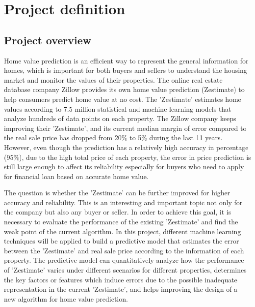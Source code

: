 \documentclass[12pt]{article}
\begin{document}
\maketitle

\section{Project definition}\label{sec:definition}
\subsection{Project overview}
Home value prediction is an efficient way to represent the general information for homes, which is important for both buyers and sellers to understand the housing market and monitor the values of their properties. The online real estate database company Zillow provides its own home value prediction (Zestimate) to help consumers predict home value at no cost. The 'Zestimate' estimates home values according to 7.5 million statistical and machine learning models that analyze hundreds of data points on each property. The Zillow company keeps improving their 'Zestimate', and its current median margin of error compared to the real sale price has dropped from 20\% to 5\% during the last 11 years. However, even though the prediction has a relatively high accuracy in percentage (95\%), due to the high total price of each property, the error in price prediction is still large enough to affect its reliability especially for buyers who need to apply for financial loan based on accurate home value.

The question is whether the 'Zestimate' can be further improved for higher accuracy and reliability. This is an interesting and important topic not only for the company but also any buyer or seller. In order to achieve this goal, it is necessary to evaluate the performance of the existing 'Zestimate' and find the weak point of the current algorithm. In this project, different machine learning techniques will be applied to build a predictive model that estimates the error between the 'Zestimate' and real sale price according to the information of each property. The predictive model can quantitatively analyze how the performance of 'Zestimate' varies under different scenarios for different properties, determines the key factors or features which induce errors due to the possible inadequate representation in the current 'Zestimate', and helps improving the design of a new algorithm for home value prediction.
\end{document}
